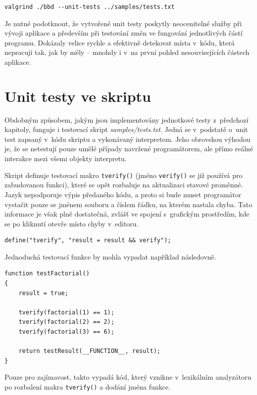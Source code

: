 \documentclass[11pt,twoside,a4paper]{book}
\begin{document}
\begin{verbatim}
valgrind ./bbd --unit-tests ../samples/tests.txt
\end{verbatim}

Je nutné podotknout, že vytvořené unit testy poskytly neocenitelné služby při vývoji aplikace a především při testování změn ve fungování jednotlivých částí programu. Dokázaly velice rychle a efektivně detekovat místa v~kódu, která nepracují tak, jak by měly -- mnohdy i v~na první pohled nesouvisejících částech aplikace.


\section{Unit testy ve skriptu}

Obdobným způsobem, jakým jsou implementovány jednotkové testy z~předchozí kapitoly, funguje i testovací skript \textit{samples/tests.txt}. Jedná se v~podstatě o~unit test zapsaný v~kódu skriptu a vykonávaný interpretem. Jeho obrovskou výhodou je, že se netestují pouze umělé případy navržené programátorem, ale přímo reálné interakce mezi všemi objekty interpretu.

Skript definuje testovací makro \texttt{tverify()} (jméno \texttt{verify()} se již používá pro zabudovanou funkci), které se opět rozbaluje na aktualizaci stavové proměnné. Jazyk nepodporuje výpis předaného kódu, a proto si bude muset programátor vystačit pouze se jménem souboru a číslem řádku, na kterém nastala chyba. Tato informace je však plně dostatečná, zvlášť ve spojení s~grafickým prostředím, kde se po kliknutí otevře místo chyby v~editoru.

\begin{verbatim}
define("tverify", "result = result && verify");
\end{verbatim}

Jednoduchá testovací funkce by mohla vypadat například následovně.

\begin{verbatim}
function testFactorial()
{
    result = true;

    tverify(factorial(1) == 1);
    tverify(factorial(2) == 2);
    tverify(factorial(3) == 6);

    return testResult(__FUNCTION__, result);
}
\end{verbatim}

Pouze pro zajímavost, takto vypadá kód, který vznikne v~lexikálním analyzátoru po rozbalení makra \texttt{tverify()} a dodání jména funkce.
\end{document}
